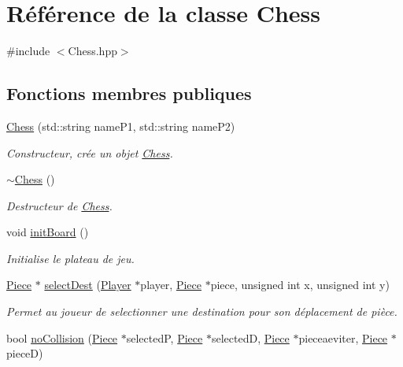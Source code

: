 \hypertarget{class_chess}{\section{Référence de la classe Chess}
\label{class_chess}
}


{\ttfamily \#include $<$Chess.\-hpp$>$}

\subsection*{Fonctions membres publiques}
\begin{DoxyCompactItemize}
\item 
\hyperlink{class_chess_a7524da0608df5a385dfd25d23d2d4e50}{Chess} (std\-::string name\-P1, std\-::string name\-P2)
\begin{DoxyCompactList}\small\item\em Constructeur, crée un objet \hyperlink{class_chess}{Chess}. \end{DoxyCompactList}\item 
\hyperlink{class_chess_aa9717ab5263bc4fbb844e78bbe5587a8}{$\sim$\-Chess} ()
\begin{DoxyCompactList}\small\item\em Destructeur de \hyperlink{class_chess}{Chess}. \end{DoxyCompactList}\item 
void \hyperlink{class_chess_a8fc79b0c34c21d522abd9b8ae62ee38f}{init\-Board} ()
\begin{DoxyCompactList}\small\item\em Initialise le plateau de jeu. \end{DoxyCompactList}\item 
\hyperlink{class_piece}{Piece} $\ast$ \hyperlink{class_chess_a67069ea8ee1fce34961fc9c645c4dc10}{select\-Dest} (\hyperlink{class_player}{Player} $\ast$player, \hyperlink{class_piece}{Piece} $\ast$piece, unsigned int x, unsigned int y)
\begin{DoxyCompactList}\small\item\em Permet au joueur de selectionner une destination pour son déplacement de pièce. \end{DoxyCompactList}\item 
bool \hyperlink{class_chess_ac29b7a4bed77102b3ddaf079ce2c9abf}{no\-Collision} (\hyperlink{class_piece}{Piece} $\ast$selected\-P, \hyperlink{class_piece}{Piece} $\ast$selected\-D, \hyperlink{class_piece}{Piece} $\ast$pieceaeviter, \hyperlink{class_piece}{Piece} $\ast$piece\-D)

\end{DoxyCompactItemize}
